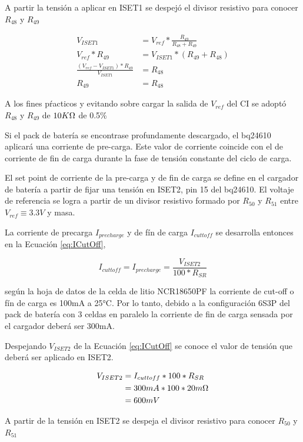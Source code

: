 \documentclass[10pt, a4paper]{report}
\begin{document}
A partir la tensión a aplicar en ISET1 se despejó el divisor resistivo para
conocer $R_{48}$ y $R_{49}$

\begin{align}
    V_{ISET1}&=V_{ref}*\frac{R_{49}}{R_{48}+R_{49}} \\
    V_{ref}*R_{49}&=V_{ISET1}*(R_{49}+R_{48}) \\
    \frac{(V_{ref}-V_{ISET1})*R_{49}}{V_{ISET1}}&=R_{48} \\
    R_{49}&=R_{48}
\end{align}

A los fines pŕacticos y evitando sobre cargar la salida de $V_{ref}$ del
\acrshort{CI} se adoptó $R_{48}$ y $R_{49}$ de $10K\ohm$ de 0.5\%

Si el pack de batería se encontrase profundamente descargado, el bq24610
aplicará una corriente de pre-carga. Este valor de corriente coincide con el de
corriente de fin de carga durante la fase de tensión constante del ciclo de
carga.

El set point de corriente de la pre-carga y de fin de carga se define en el
cargador de batería a partir de fijar una tensión en ISET2, pin 15 del bq24610.
El voltaje de referencia se logra a partir de un divisor resistivo formado
por $R_{50}$ y $R_{51}$ entre $V_{ref} \equiv 3.3V$ y masa. 

La corriente de precarga $I_{pre charge}$ y de fín de carga $I_{cutt
off}$ se desarrolla entonces en la Ecuaci\'on \ref{eq:ICutOff},

\begin{equation}
    I_{cutt off}=I_{pre charge}=\frac{V_{ISET2}}{100*R_{SR}}
    \label{eq:ICutOff}
\end{equation}

según la hoja de datos de la celda de litio NCR18650PF la corriente de cut-off o
fín de carga es 100mA a 25°C. Por lo tanto, debido a la configuración 6S3P del
pack de batería con 3 celdas en paralelo la corriente de fin de carga sensada
por el cargador deberá ser 300mA.

Despejando $V_{ISET2}$ de la Ecuación \ref{eq:ICutOff} se conoce  el valor de
tensión que deberá ser aplicado en ISET2.

\begin{align}
    V_{ISET2}&=I_{cutt off}*100*R_{SR}\\
    &=300mA*100*20m\ohm\\
    &=600mV
\end{align}

A partir de la tensión en ISET2 se despeja el divisor resistivo para conocer
$R_{50}$ y $R_{51}$
\end{document}
